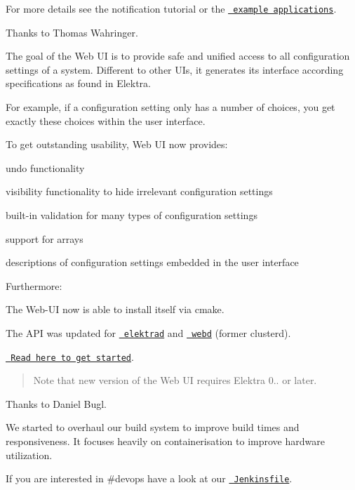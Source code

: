 For more details see the notification tutorial or the \href{https://master.libelektra.org/examples}{\texttt{ example applications}}.

Thanks to Thomas Wahringer.

The goal of the Web UI is to provide safe and unified access to all configuration settings of a system. Different to other U\+Is, it generates its interface according specifications as found in Elektra.

For example, if a configuration setting only has a number of choices, you get exactly these choices within the user interface.

To get outstanding usability, Web UI now provides\+:


\begin{DoxyItemize}
\item undo functionality
\item visibility functionality to hide irrelevant configuration settings
\item built-\/in validation for many types of configuration settings
\item support for arrays
\item descriptions of configuration settings embedded in the user interface
\end{DoxyItemize}

Furthermore\+:


\begin{DoxyItemize}
\item The Web-\/\+UI now is able to install itself via cmake.
\item The A\+PI was updated for \href{https://master.libelektra.org/doc/api_blueprints/elektrad.apib}{\texttt{ elektrad}} and \href{https://master.libelektra.org/doc/api_blueprints/webd.apib}{\texttt{ webd}} (former clusterd).
\end{DoxyItemize}

\href{https://www.libelektra.org/tools/web}{\texttt{ Read here to get started}}.

\begin{quote}
Note that new version of the Web UI requires Elektra 0.. or later. \end{quote}


Thanks to Daniel Bugl.

We started to overhaul our build system to improve build times and responsiveness. It focuses heavily on containerisation to improve hardware utilization.

If you are interested in {\ttfamily \#devops} have a look at our \href{https://github.com/ElektraInitiative/libelektra/blob/master/scripts/jenkins/Jenkinsfile}{\texttt{ Jenkinsfile}}.

